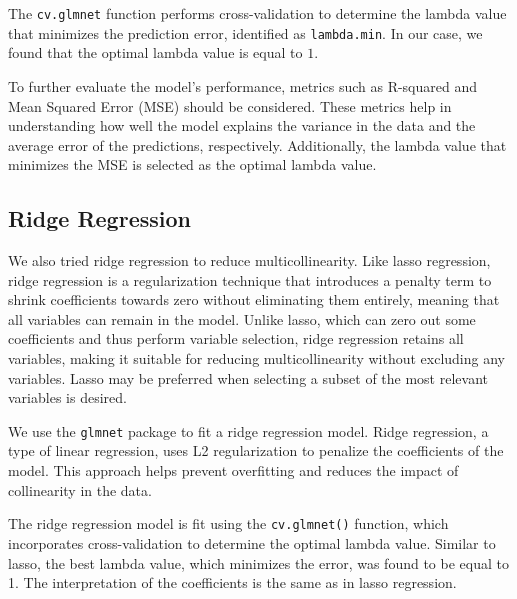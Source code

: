 \documentclass[
]{article}
\newenvironment{Shaded}{\begin{snugshade}}{\end{snugshade}}
\newcommand{\AttributeTok}[1]{\textcolor[rgb]{0.13,0.29,0.53}{#1}}
\newcommand{\ConstantTok}[1]{\textcolor[rgb]{0.56,0.35,0.01}{#1}}
\newcommand{\DecValTok}[1]{\textcolor[rgb]{0.00,0.00,0.81}{#1}}
\newcommand{\FunctionTok}[1]{\textcolor[rgb]{0.13,0.29,0.53}{\textbf{#1}}}
\newcommand{\NormalTok}[1]{#1}
\newcommand{\OtherTok}[1]{\textcolor[rgb]{0.56,0.35,0.01}{#1}}
\newcommand{\SpecialCharTok}[1]{\textcolor[rgb]{0.81,0.36,0.00}{\textbf{#1}}}
\newcommand{\StringTok}[1]{\textcolor[rgb]{0.31,0.60,0.02}{#1}}
\begin{document}
The \texttt{cv.glmnet} function performs cross-validation to determine
the lambda value that minimizes the prediction error, identified as
\texttt{lambda.min}. In our case, we found that the optimal lambda value
is equal to \(1\).

To further evaluate the model's performance, metrics such as R-squared
and Mean Squared Error (MSE) should be considered. These metrics help in
understanding how well the model explains the variance in the data and
the average error of the predictions, respectively. Additionally, the
lambda value that minimizes the MSE is selected as the optimal lambda
value.

\subsection{Ridge Regression}\label{ridge-regression}

We also tried ridge regression to reduce multicollinearity. Like lasso
regression, ridge regression is a regularization technique that
introduces a penalty term to shrink coefficients towards zero without
eliminating them entirely, meaning that all variables can remain in the
model. Unlike lasso, which can zero out some coefficients and thus
perform variable selection, ridge regression retains all variables,
making it suitable for reducing multicollinearity without excluding any
variables. Lasso may be preferred when selecting a subset of the most
relevant variables is desired.

We use the \texttt{glmnet} package to fit a ridge regression model.
Ridge regression, a type of linear regression, uses L2 regularization to
penalize the coefficients of the model. This approach helps prevent
overfitting and reduces the impact of collinearity in the data.

The ridge regression model is fit using the \texttt{cv.glmnet()}
function, which incorporates cross-validation to determine the optimal
lambda value. Similar to lasso, the best lambda value, which minimizes
the error, was found to be equal to 1. The interpretation of the
coefficients is the same as in lasso regression.

\begin{Shaded}
\end{Shaded}
\end{document}
